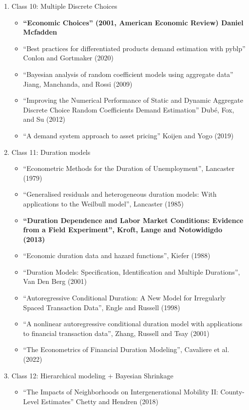 \documentclass[11pt, a4paper]{article}
\begin{document}
\begin{enumerate}
\begin{enumerate}
  \item Class 10: Multiple Discrete Choices
    \begin{itemize}
      \item \textbf{``Economic Choices''  (2001, American Economic Review) Daniel Mcfadden }
    \item ``Best practices for differentiated products demand estimation with pyblp'' Conlon and Gortmaker (2020)
    \item ``Bayesian analysis of random coefficient models using aggregate data'' Jiang, Manchanda, and Rossi (2009)
    \item ``Improving the Numerical Performance of Static and Dynamic Aggregate Discrete Choice Random Coefficients Demand Estimation'' Dub\'e, Fox, and Su (2012)
    \item ``A demand system approach to asset pricing'' Koijen and Yogo (2019)
    \end{itemize}
  \item Class 11: Duration models
    \begin{itemize}
    \item ``Econometric Methods for the Duration of Unemployment'', Lancaster (1979)
    \item ``Generalised residuals and heterogeneous duration models: With applications to the Weilbull model'', Lancaster (1985)
    \item \textbf{``Duration Dependence and Labor Market Conditions: Evidence from a Field Experiment'', Kroft, Lange and Notowidigdo (2013)}
    \item ``Economic duration data and hazard functions'', Kiefer (1988)
    \item ``Duration Models: Specification, Identification and Multiple Durations'', Van Den Berg (2001)
    \item ``Autoregressive Conditional Duration: A New Model for Irregularly Spaced Transaction Data'', Engle and Russell (1998)
    \item ``A nonlinear autoregressive conditional duration model with applications to financial transaction data'', Zhang, Russell and Tsay (2001)
    \item ``The Econometrics of Financial Duration Modeling'', Cavaliere et al. (2022)
    \end{itemize}
  \item Class 12: Hierarchical modeling + Bayesian Shrinkage
    \begin{itemize}
    \item ``The Impacts of Neighborhoods on Intergenerational Mobility II: County-Level Estimates'' Chetty and Hendren (2018)

\end{itemize}
\end{enumerate}
\end{enumerate}
\end{document}
